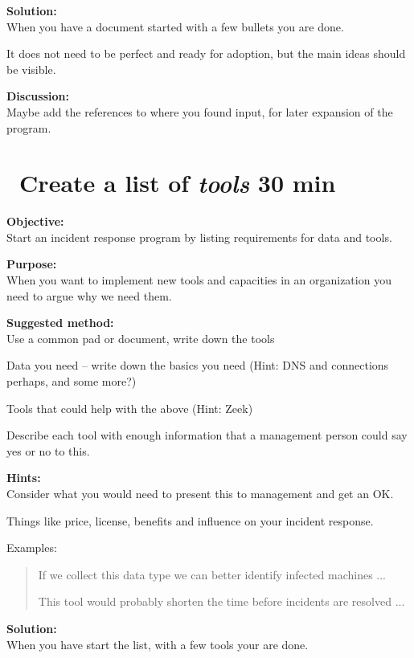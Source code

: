 \documentclass[a4paper,11pt,notitlepage]{report}
\begin{document}
{\bf Solution:}\\
When you have a document started with a few bullets you are done.

It does not need to be perfect and ready for adoption, but the main ideas should be visible.

{\bf Discussion:}\\
Maybe add the references to where you found input, for later expansion of the program.

\chapter{\faExclamationTriangle\ Create a list of \emph{tools} 30 min}
\label{ex:tools-list}


{\bf Objective:}\\
Start an incident response program by listing requirements for data and tools.


{\bf Purpose:}\\
When you want to implement new tools and capacities in an organization you need to argue why we need them.

{\bf Suggested method:}\\
Use a common pad or document, write down the tools
\begin{list2}
\item Data you need -- write down the basics you need (Hint: DNS and connections perhaps, and some more?)
\item Tools that could help with the above (Hint: Zeek)
\item Describe each tool with enough information that a management person could say yes or no to this.
\end{list2}



{\bf Hints:}\\
Consider what you would need to present this to management and get an OK.

Things like price, license, benefits and influence on your incident response.

Examples:
\begin{quote}
If we collect this data type we can better identify infected machines ...

This tool would probably shorten the time before incidents are resolved ...
\end{quote}


{\bf Solution:}\\
When you have start the list, with a few tools your are done.
\end{document}
